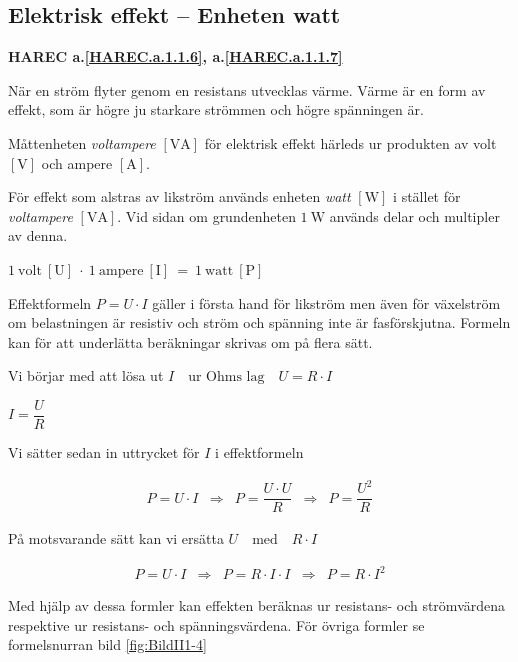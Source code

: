 \subsection{Elektrisk effekt -- Enheten watt}
\textbf{HAREC a.\ref{HAREC.a.1.1.6}\label{myHAREC.a.1.1.6}, a.\ref{HAREC.a.1.1.7}\label{myHAREC.a.1.1.7}}

När en ström flyter genom en resistans utvecklas värme.
Värme är en form av effekt, som är högre ju starkare strömmen och högre
spänningen är.

Måttenheten \emph{voltampere} \(\mathrm{[VA]}\) för elektrisk effekt härleds ur
produkten av volt \(\mathrm{[V]}\) och ampere \(\mathrm{[A]}\).

För effekt som alstras av likström används enheten \emph{watt} \(\mathrm{[W]}\)
\cite{SIbrochure8} i stället för \emph{voltampere} \(\mathrm{[VA]}\).
Vid sidan om grundenheten \(1\ \mathrm{W}\) används delar och multipler av
denna.

\(1\ \mathrm{volt\ [U]}\ \cdot\ 1\ \mathrm{ampere\ [I]}\ =\ 1\ \mathrm{watt\ [P]}\)

Effektformeln \(P = U \cdot I\) gäller i första hand för likström men även för
växelström om belastningen är resistiv och ström och spänning inte är
fasförskjutna.
Formeln kan för att underlätta beräkningar skrivas om på flera sätt.

Vi börjar med att lösa ut \(I \quad \text{ur Ohms lag} \quad U = R \cdot I\) 

\(
I = \dfrac{U}{R}
\)

Vi sätter sedan in uttrycket för \(I\) i effektformeln


\[ \begin{array}{lllll}
P=U \cdot I & \Rightarrow & P= \dfrac{U \cdot U}{R} & \Rightarrow & P= \dfrac{U^2}{R}
\end{array} \]


På motsvarande sätt kan vi ersätta \(U \quad\text{med}\quad R \cdot I\)


\[ \begin{array}{lllll}
P=U \cdot I & \Rightarrow & P = R \cdot I \cdot I  & \Rightarrow & P = R \cdot I^2
\end{array} \]


Med hjälp av dessa formler kan effekten beräknas ur resistans- och strömvärdena
respektive ur resistans- och spänningsvärdena.
För övriga formler se formelsnurran bild \ref{fig:BildII1-4}

